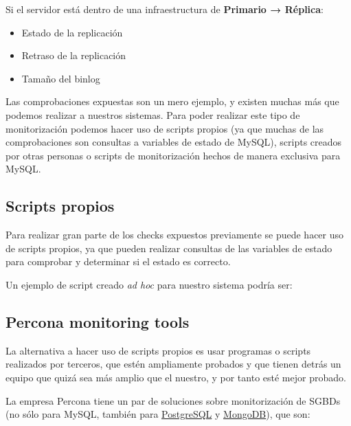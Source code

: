 Si el servidor está dentro de una infraestructura de \textbf{Primario → Réplica}:
\begin{itemize}
    \item Estado de la replicación
    \item Retraso de la replicación
    \item Tamaño del binlog
\end{itemize}

Las comprobaciones expuestas son un mero ejemplo, y existen muchas más que podemos realizar a nuestros sistemas. Para poder realizar este tipo de monitorización podemos hacer uso de scripts propios (ya que muchas de las comprobaciones son consultas a variables de estado de MySQL), scripts creados por otras personas o scripts de monitorización hechos de manera exclusiva para MySQL.

\subsection{Scripts propios}
Para realizar gran parte de los checks expuestos previamente se puede hacer uso de scripts propios, ya que pueden realizar consultas de las variables de estado para comprobar y determinar si el estado es correcto.

Un ejemplo de script creado \textit{ad hoc} para nuestro sistema podría ser:



\subsection{Percona monitoring tools}
La alternativa a hacer uso de scripts propios es usar programas o scripts realizados por terceros, que estén ampliamente probados y que tienen detrás un equipo que quizá sea más amplio que el nuestro, y por tanto esté mejor probado.

La empresa Percona tiene un par de soluciones sobre monitorización de SGBDs (no sólo para MySQL, también para \href{https://www.postgresql.org/}{PostgreSQL} y \href{https://www.mongodb.com/}{MongoDB}), que son:

